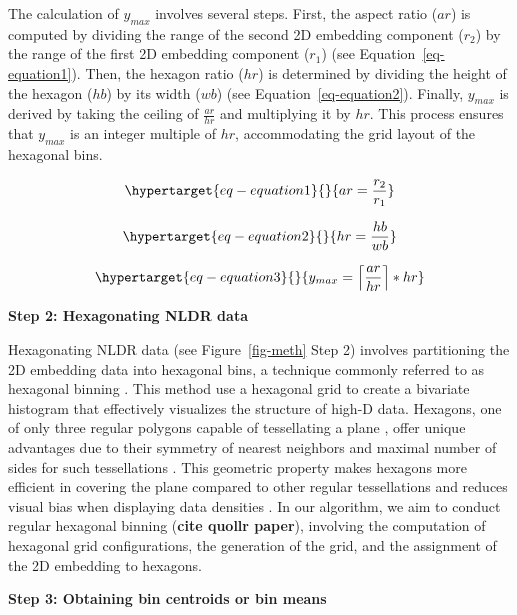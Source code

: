 \documentclass[
  12pt]{article}
\begin{document}
The calculation of \(y_{max}\) involves several steps. First, the aspect
ratio (\(ar\)) is computed by dividing the range of the second 2D
embedding component (\(r_2\)) by the range of the first 2D embedding
component (\(r_1\)) (see Equation~\ref{eq-equation1}). Then, the hexagon
ratio (\(hr\)) is determined by dividing the height of the hexagon
(\(hb\)) by its width (\(wb\)) (see Equation~\ref{eq-equation2}).
Finally, \(y_{max}\) is derived by taking the ceiling of
\(\frac{ar}{hr}\) and multiplying it by \(hr\). This process ensures
that \(y_{max}\) is an integer multiple of \(hr\), accommodating the
grid layout of the hexagonal bins.

\begin{equation}\protect\hypertarget{eq-equation1}{}{
 ar = \frac{r_2}{r_1}
}\label{eq-equation1}\end{equation}

\begin{equation}\protect\hypertarget{eq-equation2}{}{
 hr = \frac{hb}{wb}
}\label{eq-equation2}\end{equation}

\begin{equation}\protect\hypertarget{eq-equation3}{}{
 y_{max} = \left\lceil\frac{ar}{hr}\right\rceil * hr
}\label{eq-equation3}\end{equation}

\textbf{Step 2: Hexagonating NLDR data}

Hexagonating NLDR data (see Figure~\ref{fig-meth} Step 2) involves
partitioning the 2D embedding data into hexagonal bins, a technique
commonly referred to as hexagonal binning
\citep[\citet{article66}]{Carr1987}. This method use a hexagonal grid to
create a bivariate histogram that effectively visualizes the structure
of high-D data. Hexagons, one of only three regular polygons capable of
tessellating a plane \citep{Carr2013}, offer unique advantages due to
their symmetry of nearest neighbors and maximal number of sides for such
tessellations \citep{Dan2023}. This geometric property makes hexagons
more efficient in covering the plane compared to other regular
tessellations and reduces visual bias when displaying data densities
\citep{Dan2023}. In our algorithm, we aim to conduct regular hexagonal
binning (\textbf{cite quollr paper}), involving the computation of
hexagonal grid configurations, the generation of the grid, and the
assignment of the 2D embedding to hexagons.

\textbf{Step 3: Obtaining bin centroids or bin means}
\end{document}
